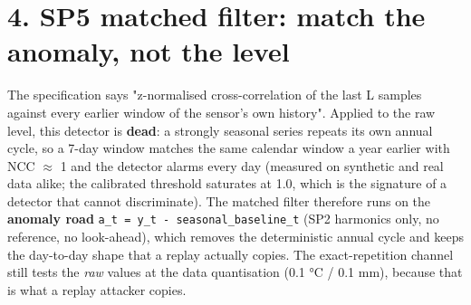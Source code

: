 \documentclass[10pt,a4paper]{article}
\begin{document}
\section*{4. SP5 matched filter: match the anomaly, not the level}
The specification says "z-\allowbreak{}normalised cross-\allowbreak{}correlation of the last L samples against every earlier window of the sensor's own history". Applied to the raw level, this detector is \textbf{dead}: a strongly seasonal series repeats its own annual cycle, so a 7-\allowbreak{}day window matches the same calendar window a year earlier with NCC $\approx$ 1 and the detector alarms every day (measured on synthetic and real data alike; the calibrated threshold saturates at 1.0, which is the signature of a detector that cannot discriminate). The matched filter therefore runs on the \textbf{anomaly road} \texttt{a\_\allowbreak{}t = y\_\allowbreak{}t -\allowbreak{} seasonal\_\allowbreak{}baseline\_\allowbreak{}t} (SP2 harmonics only, no reference, no look-\allowbreak{}ahead), which removes the deterministic annual cycle and keeps the day-\allowbreak{}to-\allowbreak{}day shape that a replay actually copies. The exact-\allowbreak{}repetition channel still tests the \emph{raw} values at the data quantisation (0.1 °C /\allowbreak{} 0.1 mm), because that is what a replay attacker copies.
\end{document}
